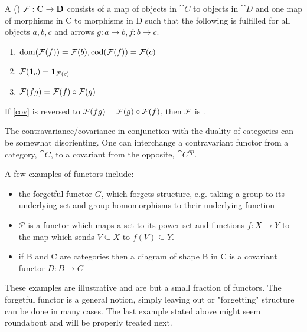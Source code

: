 \documentclass[../../main.tex]{subfiles}
\begin{document}
    \begin{definition}
        A ()  $\functor{F}: \cat{C} \to \cat{D}$ consists of a map of objects in $\cat{C}$ to objects in $\cat{D}$ and one map of morphisms in C to morphisms in D such that the following is fulfilled for all objects $a, b, c$ and arrows $g: a \to b, f: b \to c$.
        
        \begin{enumerate}
            \item $\domain{\functor{F}(f)} = \functor{F}(b), \codomain{\functor{F}(f)} = \functor{F}(c)$
            \item $\functor{F}(\idarrow[c]) = \idarrow[\functor{F}(c)]$
            \item $\functor{F}(fg) = \functor{F}(f) \circ \functor{F}(g)$ \label{cov}
        \end{enumerate}
        
        If \ref{cov} is reversed to $\functor{F}(fg) = \functor{F}(g) \circ \functor{F}(f)$, then $\functor{F}$ is .
    \end{definition}
    
    The contravariance/covariance in conjunction with the duality of categories can be somewhat disorienting. One can interchange a contravariant functor from a category, $\cat{C}$, to a covariant from the opposite, $\cat{C^{op}}$.

    \begin{example}\label{functor_exmp}
        A few examples of functors include:
        \begin{itemize}
            \item the forgetful functor $G$, which forgets structure, e.g. taking a group to its underlying set and group homomorphisms to their underlying function
            \item $\mathcal{P}$ is a functor which maps a set to its power set and functions $f:X\to Y$ to the map which sends $V\subseteq X $ to $f(V)\subseteq Y$. 
            \item if B and C are categories then a diagram of shape B in C is a covariant functor $D:B\to C$
        \end{itemize}
    \end{example}

    These examples are illustrative and are but a small fraction of functors. The forgetful functor is a general notion, simply leaving out or "forgetting" structure can be done in many cases. The last example stated above might seem roundabout and will be properly treated next. 
    
\end{document}
